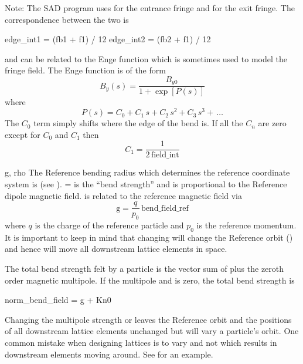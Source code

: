 \begin{description}
\begin{example}
Note: The SAD program uses  for the entrance fringe and  for the exit
fringe. The correspondence between the two is
\begin{example2}
  edge_int1 = (fb1 + f1) / 12
  edge_int2 = (fb2 + f1) / 12
\end{example2}

 and  can be related to the Enge function which is sometimes used to model the
fringe field. The Enge function is of the form
\begin{equation}
  B_y(s) = \frac{B_{y0}}{1 + \exp[P(s)]}
\end{equation}
where
\begin{equation}
  P(s) = C_0 + C_1 \, s + C_2 \, s^2 + C_3 \, s^3 + \, \ldots
\end{equation}
The $C_0$ term simply shifts where the edge of the bend is. If all the $C_n$ are zero except for
$C_0$ and $C_1$ then
\begin{equation}
  C_1 = \frac{1}{2 \, \text{field_int}}
\end{equation}
  \item[g, rho] \Newline
The Reference bending radius which determines the reference coordinate system is  (see
).  =  is the ``bend strength'' and is proportional to the Reference
dipole magnetic field.  is related to the reference magnetic field  via
\begin{equation}
  \text{g} = \frac{q}{p_0} \, \text{bend_field_ref} 
  \label{gqpb}
\end{equation}
where $q$ is the charge of the reference particle and $p_0$ is the reference momentum. It is
important to keep in mind that changing  will change the Reference orbit () and
hence will move all downstream lattice elements in space.

The total bend strength felt by a particle is the vector sum of  plus the zeroth order
magnetic multipole. If the multipole  and  is zero, the total bend strength is
\begin{example}
  norm_bend_field = g + Kn0
\end{example}
Changing the multipole strength  or  leaves the Reference orbit and the positions of
all downstream lattice elements
unchanged but will vary a particle's orbit. One common mistake when designing lattices is to vary
 and not  which results in downstream elements moving around. See 
for an example.


\end{example}
\end{description}

